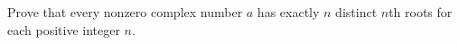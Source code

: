 Prove that every nonzero complex number $a$ has exactly $n$ distinct $n$th roots for each positive integer $n$.
